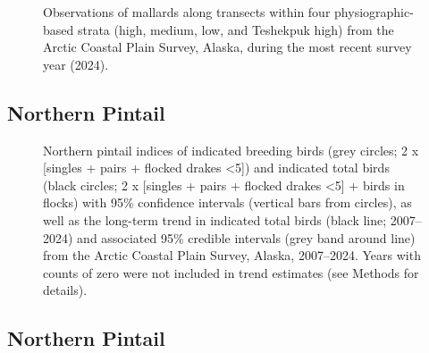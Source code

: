 \documentclass[
]{article}
\begin{document}
\begin{figure}


\caption{\label{fig-MALLmap}Observations of mallards along transects
within four physiographic-based strata (high, medium, low, and Teshekpuk
high) from the Arctic Coastal Plain Survey, Alaska, during the most
recent survey year (2024).}

\end{figure}%

\newpage{}

\subsection*{Northern Pintail}\label{northern-pintail}

\begin{figure}


\caption{\label{fig-NOPI}Northern pintail indices of indicated breeding
birds (grey circles; 2 x {[}singles + pairs + flocked drakes
\textless5{]}) and indicated total birds (black circles; 2 x {[}singles
+ pairs + flocked drakes \textless5{]} + birds in flocks) with 95\%
confidence intervals (vertical bars from circles), as well as the
long-term trend in indicated total birds (black line; 2007--2024) and
associated 95\% credible intervals (grey band around line) from the
Arctic Coastal Plain Survey, Alaska, 2007--2024. Years with counts of
zero were not included in trend estimates (see Methods for details).}

\end{figure}%

\newpage{}

\subsection*{Northern Pintail}\label{northern-pintail-1}

\begingroup\fontsize{10}{12}\selectfont
\end{document}
